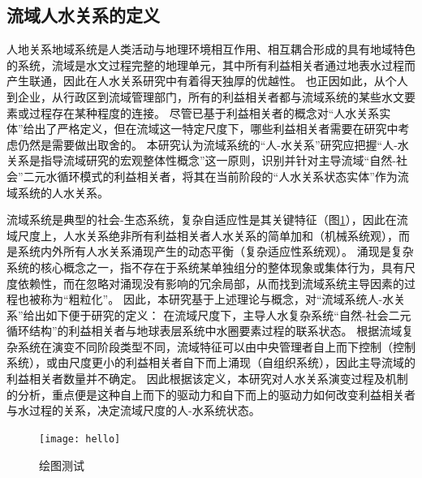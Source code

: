 

\subsection{流域人水关系的定义}

人地关系地域系统是人类活动与地理环境相互作用、相互耦合形成的具有地域特色的系统\cite{tan2021}，流域是水文过程完整的地理单元，其中所有利益相关者通过地表水过程而产生联通，因此在人水关系研究中有着得天独厚的优越性。
也正因如此，从个人到企业，从行政区到流域管理部门，所有的利益相关者都与流域系统的某些水文要素或过程存在某种程度的连接。
尽管已基于利益相关者的概念对“人水关系实体”给出了严格定义，但在流域这一特定尺度下，哪些利益相关者需要在研究中考虑仍然是需要做出取舍的。
本研究认为流域系统的“人-水关系”研究应把握“人-水关系是指导流域研究的宏观整体性概念”这一原则，识别并针对主导流域“自然-社会”二元水循环模式的利益相关者，将其在当前阶段的“人水关系状态实体”作为流域系统的人水关系。

流域系统是典型的社会-生态系统，复杂自适应性是其关键特征（图\ref{ch2:fig:complexity}），因此在流域尺度上，人水关系绝非所有利益相关者人水关系的简单加和（机械系统观），而是系统内外所有人水关系涌现产生的动态平衡（复杂适应性系统观）。
涌现是复杂系统的核心概念之一，指不存在于系统某单独组分的整体现象或集体行为，具有尺度依赖性，而在忽略对涌现没有影响的冗余局部，从而找到流域系统主导因素的过程也被称为“粗粒化”。
因此，本研究基于上述理论与概念，对“流域系统人-水关系”给出如下便于研究的定义：
在流域尺度下，主导人水复杂系统“自然-社会二元循环结构”的利益相关者与地球表层系统中水圈要素过程的联系状态。
根据流域复杂系统在演变不同阶段类型不同，流域特征可以由中央管理者自上而下控制（控制系统），或由尺度更小的利益相关者自下而上涌现（自组织系统），因此主导流域的利益相关者数量并不确定。
因此根据该定义，本研究对人水关系演变过程及机制的分析，重点便是这种自上而下的驱动力和自下而上的驱动力如何改变利益相关者与水过程的关系，决定流域尺度的人-水系统状态。

\begin{figure}[htb] %
    \texttt{[image: hello]}
    \caption[流域系统作为社会-生态系统的概念图式]{绘图测试}\label{ch2:fig:complexity}
\end{figure}
